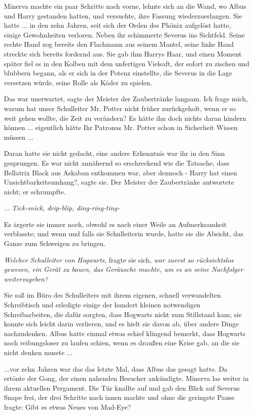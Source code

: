 Minerva machte ein paar Schritte nach vorne, lehnte sich an die Wand, wo Albus
und Harry gestanden hatten, und versuchte, ihre Fassung wiederzuerlangen. Sie
hatte ... in den zehn Jahren, seit sich der Orden des Phönix aufgelöst hatte,
einige Gewohnheiten verloren. Neben ihr schimmerte Severus ins Sichtfeld. Seine
rechte Hand zog bereits den Flachmann aus seinem Mantel, seine linke Hand
streckte sich bereits fordernd aus. Sie gab ihm Harrys Haar, und einen Moment
später fiel es in den Kolben mit dem unfertigen Vielsaft, der sofort zu zischen
und blubbern begann, als er sich in der Potenz einstellte, die Severus in die
Lage versetzen würde, seine Rolle als Köder zu spielen.

\glqq{}Das war unerwartet\grqq{}, sagte der Meister der Zaubertränke langsam.
\glqq{}Ich frage mich, warum hat unser Schulleiter Mr. Potter nicht früher
zurückgeholt, wenn er so weit gehen wollte, die Zeit zu verändern? Es hätte ihn
doch nichts daran hindern können ... eigentlich hätte Ihr Patronus Mr. Potter
schon in Sicherheit Wissen müssen ...\grqq{}

Daran hatte sie nicht gedacht, eine andere Erkenntnis war ihr in den Sinn
gesprungen. Es war nicht annähernd so erschreckend wie die Tatsache, dass
Bellatrix Black aus Askaban entkommen war, aber dennoch - \glqq{}Harry hat einen
Unsichtbarkeitsumhang?\grqq{}, sagte sie. Der Meister der Zaubertränke
antwortete nicht; er schrumpfte.

...
\emph{Tick-snick, drip-blip, ding-ring-ting-}

Es ärgerte sie immer noch, obwohl es nach einer Weile an Aufmerksamkeit
verblasste; und wenn und falls sie Schulleiterin wurde, hatte sie die Absicht,
das Ganze zum Schweigen zu bringen.

\emph{Welcher Schulleiter von Hogwarts,} fragte sie sich\emph{, war zuerst so
rücksichtslos gewesen, ein Gerät zu bauen, das Geräusche machte, um es an seine
Nachfolger weiterzugeben?}

Sie saß im Büro des Schulleiters mit ihrem eigenen, schnell verwandelten
Schreibtisch und erledigte einige der hundert kleinen notwendigen
Schreibarbeiten, die dafür sorgten, dass Hogwarts nicht zum Stillstand kam; sie
konnte sich leicht darin verlieren, und es hielt sie davon ab, über andere Dinge
nachzudenken. Albus hatte einmal etwas schief klingend bemerkt, dass Hogwarts
noch reibungsloser zu laufen schien, wenn es draußen eine Krise gab, an die sie
nicht denken musste ...

...vor zehn Jahren war das das letzte Mal, dass Albus das gesagt hatte. Da
ertönte der Gong, der einen nahenden Besucher ankündigte. Minerva las weiter in
ihrem aktuellen Pergament. Die Tür knallte auf und gab den Blick auf Severus
Snape frei, der drei Schritte nach innen machte und ohne die geringste Pause
fragte: \glqq{}Gibt es etwas Neues von Mad-Eye?\grqq{}

